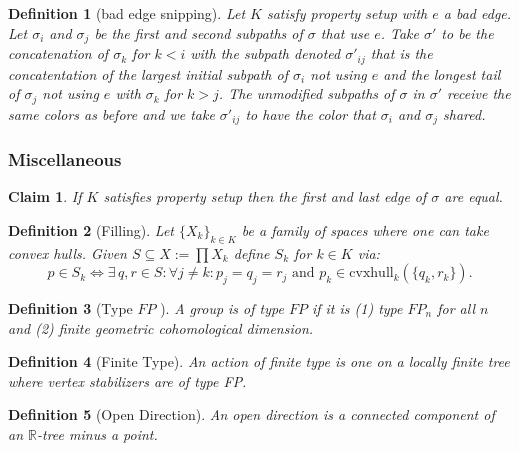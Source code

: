 \documentclass{article}
\theoremstyle{mystyle}
\newtheorem{defn}{Definition}
\newtheorem*{claim*}{Claim}
\theoremstyle{remark}
\begin{document}
\begin{defn}
	[bad edge snipping]
    Let \(K\) satisfy property setup with \(e\) a bad edge. Let \(\sigma_{i}\) and \(\sigma_{j}\) be the first and second subpaths of \(\sigma\) that use \(e\). Take \(\sigma '\) to be the concatenation of \(\sigma_{k}\) for \(k < i\) with the subpath denoted \(\sigma '_{ij}\) that is the concatentation of the largest initial subpath of \(\sigma_{i}\) not using \(e\) and the longest tail of \(\sigma_j\) not using \(e\) with \(\sigma_{k}\) for \(k > j\). The unmodified subpaths of \(\sigma\) in \(\sigma '\) receive the same colors as before and we take \(\sigma '_{ij}\) to have the color that \(\sigma_{i}\) and \(\sigma_{j}\) shared.
\end{defn}
\subsubsection{Miscellaneous}
\begin{claim*}
    If \(K\) satisfies property setup then the first and last edge of \(\sigma\) are equal.
\end{claim*}
\begin{defn}
	[Filling]
    Let \(\{X_{k}\}_{k \in K}\) be a family of spaces where one can take convex hulls. Given \(S \subseteq X := \prod X_{k}\) define \(S_{k}\) for \(k \in K\) via: \[p \in S_{k} \iff \exists \,q,r \in S: \forall j \neq k: p_{j} = q_{j} = r_{j} \text{ and } p_{k} \in \text{cvxhull}_k (\{q_{k} , r_{k}\}).\] 
\end{defn}
\begin{defn}
	[Type \(FP\) ]
	A group is of type \(FP\) if it is (1) type \(FP_n\) for all \(n\) and (2) finite geometric cohomological dimension.
\end{defn}

\begin{defn}
	[Finite Type] 
	An action of {\em finite type} is one on a locally finite tree where  vertex stabilizers are of type FP.
\end{defn}

\begin{defn}[Open Direction] An open direction is a connected component of an \(\mathbb{R}\)-tree minus a point. 
\end{defn}
\end{document}
